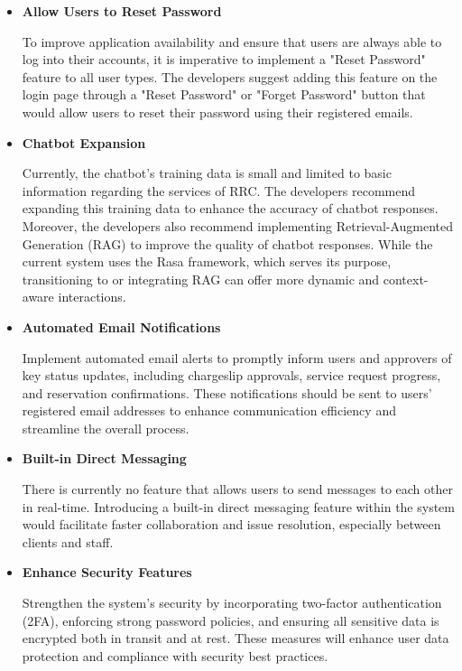 \begin{itemize}
	
	\item \textbf{Allow Users to Reset Password}
	
	To improve application availability and ensure that users are always able to log into their accounts, it is imperative to implement a "Reset Password" feature to all user types. The developers suggest adding this feature on the login page through a "Reset Password" or "Forget Password" button that would allow users to reset their password using their registered emails.
	
	\item \textbf{Chatbot Expansion}
	
	Currently, the chatbot's training data is small and limited to basic information regarding the services of RRC. The developers recommend expanding this training data to enhance the accuracy of chatbot responses. Moreover, the developers also recommend implementing Retrieval-Augmented Generation (RAG) to improve the quality of chatbot responses. While the current system uses the Rasa framework, which serves its purpose, transitioning to or integrating RAG can offer more dynamic and context-aware interactions.
	
	\item \textbf{Automated Email Notifications}
	
	Implement automated email alerts to promptly inform users and approvers of key status updates, including chargeslip approvals, service request progress, and reservation confirmations. These notifications should be sent to users' registered email addresses to enhance communication efficiency and streamline the overall process.
	
	\item \textbf{Built-in Direct Messaging}
	
	There is currently no feature that allows users to send messages to each other in real-time. Introducing a built-in direct messaging feature within the system would facilitate faster collaboration and issue resolution, especially between clients and staff.
	
	\item \textbf{Enhance Security Features}
	
	Strengthen the system’s security by incorporating two-factor authentication (2FA), enforcing strong password policies, and ensuring all sensitive data is encrypted both in transit and at rest. These measures will enhance user data protection and compliance with security best practices.
	

\end{itemize}
